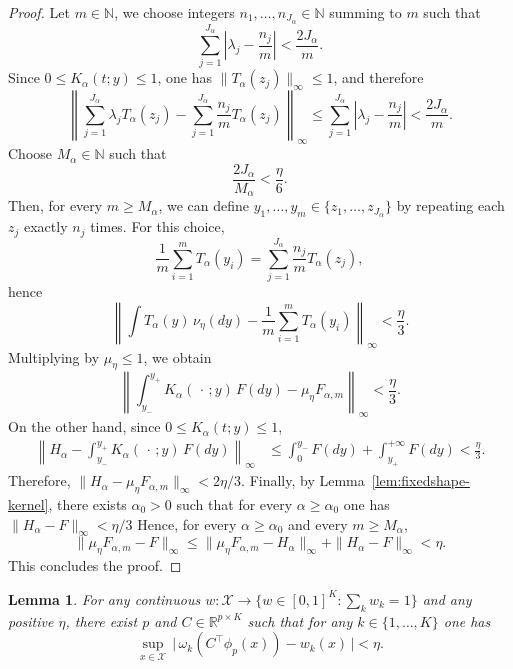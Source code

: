 \documentclass{article}
\newtheorem{lemma}[theorem]{Lemma}
\newcommand{\R}{\mathbb{R}}
\begin{document}
\begin{proof}
Let $m\in\mathbb N$, we choose integers
$n_1,\dots,n_{J_\alpha}\in\mathbb N$ summing to $m$ such that
\[
\sum_{j=1}^{J_\alpha}\left|\lambda_j-\frac{n_j}{m}\right|
<\frac{2J_\alpha}{m}.
\]
Since $0\le K_\alpha(t;y)\le 1$, one has
$\|T_\alpha(z_j)\|_\infty\le 1$, and therefore
\[
\left\|
\sum_{j=1}^{J_\alpha}\lambda_j T_\alpha(z_j)
-
\sum_{j=1}^{J_\alpha}\frac{n_j}{m}T_\alpha(z_j)
\right\|_\infty
\le
\sum_{j=1}^{J_\alpha}\left|\lambda_j-\frac{n_j}{m}\right|
<
\frac{2J_\alpha}{m}.
\]
Choose $M_\alpha\in\mathbb N$ such that
\[
\frac{2J_\alpha}{M_\alpha}<\frac{\eta}{6}.
\]
Then, for every $m\ge M_\alpha$, we can define
$y_1,\dots,y_m\in\{z_1,\dots,z_{J_\alpha}\}$ by repeating each $z_j$ exactly
$n_j$ times. For this choice,
\[
\frac1m\sum_{i=1}^m T_\alpha(y_i)
=
\sum_{j=1}^{J_\alpha}\frac{n_j}{m}T_\alpha(z_j),
\]
hence
\[
\left\|
\int T_\alpha(y)\,\nu_\eta(dy)-\frac1m\sum_{i=1}^m T_\alpha(y_i)
\right\|_\infty
<\frac{\eta}{3}.
\]
Multiplying by $\mu_\eta\le 1$, we obtain
\[
\left\|
\int_{y_-}^{y_+} K_\alpha(\,\cdot\,;y)\,F(dy)
-
\mu_\eta F_{\alpha,m}
\right\|_\infty
<\frac{\eta}{3}.
\]
On the other hand, since $0\le K_\alpha(t;y)\le 1$,
\begin{align*}
\left\|
H_\alpha-\int_{y_-}^{y_+}K_\alpha(\,\cdot\,;y)\,F(dy)
\right\|_\infty
&\le
\int_0^{y_-}F(dy)+\int_{y_+}^{+\infty}F(dy)
<\frac{\eta}{3}.
\end{align*}
Therefore, $\|H_\alpha-\mu_\eta F_{\alpha,m}\|_\infty< 2\eta/3$. Finally, by Lemma~\ref{lem:fixedshape-kernel}, there exists $\alpha_0>0$ such
that for every $\alpha\ge \alpha_0$ one has $\|H_\alpha-F\|_\infty<\eta/3$
Hence, for every $\alpha\ge \alpha_0$ and every $m\ge M_\alpha$,
\[
\|\mu_\eta F_{\alpha,m}-F\|_\infty
\le
\|\mu_\eta F_{\alpha,m}-H_\alpha\|_\infty+\|H_\alpha-F\|_\infty
<\eta.
\]
This concludes the proof.
\end{proof}

\begin{lemma}\label{lem:softmax}
For any continuous $w:\mathcal X\to \{w\in[0,1]^K:\sum_k w_k=1\}$ and any positive $\eta$,
there exist $p$ and $C\in\R^{p\times K}$ such that for any $k \in \{1,\ldots,K\}$ one has
\[
  \sup_{x\in\mathcal X}\, \Big\vert \,\omega_k(C^\top\phi_p(x))- w_k(x)\, \Big\vert <\eta.
\]
\end{lemma}
\end{document}
